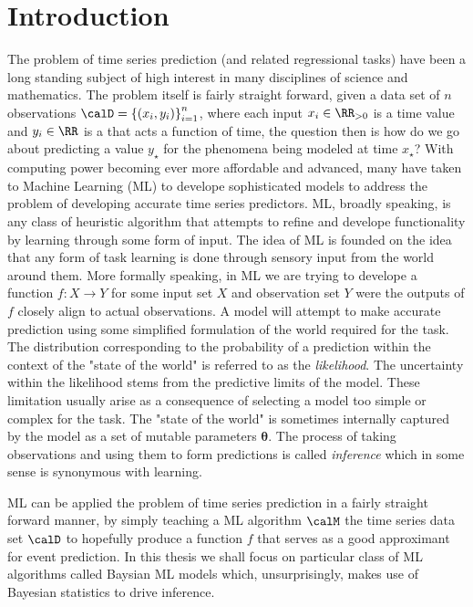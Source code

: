 \section*{Introduction}
The problem of time series prediction (and related regressional tasks) have been a long standing subject of high interest in many disciplines of science and mathematics. The problem itself is fairly straight forward, given a data set of $n$ observations $\calD = \left\{ \left( x_i , y_i \right) \right\}_{i=1}^{n}$, where each input $x_i \in \RR_{>0}$ is a time value and $y_i \in \RR$ is a that acts a function of time, the question then is how do we go about predicting a value $y_{\star}$ for the phenomena being modeled at time $x_{\star}$? With computing power becoming ever more affordable and advanced, many have taken to Machine Learning (ML) to develope sophisticated models to address the problem of developing accurate time series predictors. ML, broadly speaking, is any class of heuristic algorithm that attempts to refine and develope functionality by learning through some form of input. The idea of ML is founded on the idea that any form of task learning is done through sensory input from the world around them. More formally speaking, in ML we are trying to develope a function $f : X \to Y$ for some input set $X$ and observation set $Y$ were the outputs of $f$ closely align to actual observations. A model will attempt to make accurate prediction using some simplified formulation of the world required for the task. The distribution corresponding to the probability of a prediction within the context of the "state of the world" is referred to as the {\it likelihood}. The uncertainty within the likelihood stems from the predictive limits of the model. These limitation usually arise as a consequence of selecting a model too simple or complex for the task. The "state of the world" is sometimes internally captured by the model as a set of mutable parameters $\bm{\theta}$. The process of taking observations and using them to form predictions is called {\it inference} which in some sense is synonymous with learning.

ML can be applied the problem of time series prediction in a fairly straight forward manner, by simply teaching a ML algorithm $\calM$ the time series data set $\calD$ to hopefully produce a function $f$ that serves as a good approximant for event prediction. In this thesis we shall focus on particular class of ML algorithms called Baysian ML models which, unsurprisingly, makes use of Bayesian statistics to drive inference.

